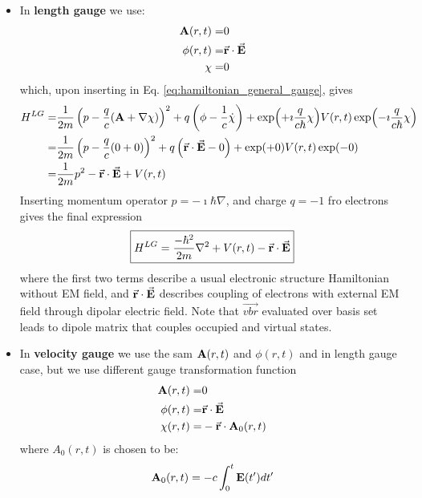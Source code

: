 \documentclass[11pt]{article}
\begin{document}
\begin{itemize}
\item In {\bf length gauge} we use:
\begin{align}
    \nonumber \vb A(r,t)  =& 0\\
    \nonumber \phi(r,t)   =& \vec {\vb r} \cdot \vec {\vb E} \\
    \label{eq:chi_lg} \chi        =&0 
\end{align}
which, upon inserting in Eq. \ref{eq:hamiltonian_general_gauge}, gives
\begin{align*}
    H^{LG} =& \frac{1}{2m} \left(p-\frac{q}{c}(\vb A +\nabla \chi) \right)^2  + q\left( \phi  - \frac{1}{c} \dot \chi \right)   +  \exp(+\imath \frac{q}{c\hbar}\chi)  V(r,t) \exp(-\imath \frac{q}{c\hbar}\chi)\\
      =& \frac{1}{2m} \left(p-\frac{q}{c}(0 +0) \right)^2  + q\left( \vec {\vb r} \cdot \vec {\vb E}  -  0 \right)   +  \exp(+0 )  V(r,t)  \exp(-0)\\
      =&\frac{1}{2m} p^2   - \vec {\vb r} \cdot \vec {\vb E}  + V(r,t)
\end{align*}
Inserting  momentum operator $p = -\imath \hbar \nabla$, and charge $q=-1$ fro electrons gives the final expression 
\begin{equation}
\boxed{
     H^{LG} = \frac{-\hbar^2}{2m} \nabla^2 + V(r,t) - \vec {\vb r} \cdot \vec {\vb E}  } 
     \label{eq:H_lg}
\end{equation}
where the first two terms describe a usual electronic structure  Hamiltonian without EM field, and $\vec {\vb r} \cdot \vec {\vb E}$ describes coupling of  electrons  with external EM field through dipolar electric field. Note that $\vec {vb r}$ evaluated over  basis set  leads to dipole matrix that couples occupied  and virtual states.
\item In {\bf velocity gauge} we use  the sam $ \vb A(r,t)$  and $\phi(r,t)$ and in length gauge case, but we use  different  gauge transformation  function
\begin{align}
 \nonumber    \vb A(r,t)  =& 0 \\
  \nonumber  \phi(r,t)   =& \vec {\vb r} \cdot \vec {\vb E} \\
    \chi(r,t)   =& -\vec{\vb r}\cdot \vb A_0(r,t)
    \label{eq:chi_vg}
\end{align}
where  $A_0(r,t)$ is chosen to be:
\begin{equation}
\vb A_0(r,t) = -c \int_0^t \vb E(t') dt' \label{eq:A0_vg}
\end{equation}

\end{itemize}
\end{document}
